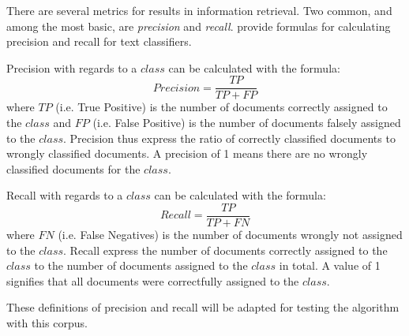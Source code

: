 There are several metrics for results in information retrieval. Two common, and among the most basic, are \textit{precision} and \textit{recall}. \cite{Sebastiani2002,Baeza-Yates2011a} provide formulas for calculating precision and recall for text classifiers.

Precision with regards to a \(class\) can be calculated with the formula:
\begin{displaymath}
Precision = 
\frac{TP}{TP + FP}
\end{displaymath}
where \(TP\) (i.e. True Positive) is the number of documents correctly assigned to the \(class\) and \(FP\) (i.e. False Positive) is the number of documents falsely assigned to the \(class\). Precision thus express the ratio of correctly classified documents to wrongly classified documents. A precision of 1 means there are no wrongly classified documents for the \(class\).

Recall with regards to a \(class\) can be calculated with the formula: 
\begin{displaymath}
Recall = 
\frac{TP}{TP + FN}
\end{displaymath}
where \(FN\) (i.e. False Negatives) is the number of documents wrongly not assigned to the \(class\). Recall express the number of documents correctly assigned to the \(class\) to the number of documents assigned to the \(class\) in total. A value of 1 signifies that all documents were correctfully assigned to the \(class\).

These definitions of precision and recall will be adapted for testing the \CTC algorithm with this corpus.




